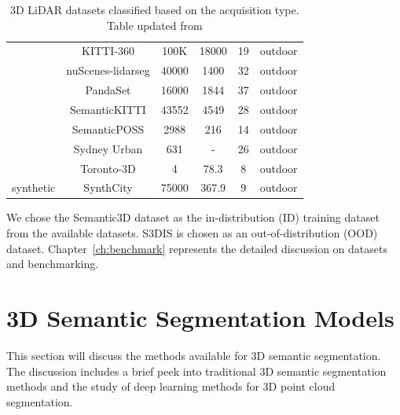 \begin{table}[h!]
\begin{tabular}{c|c|c|c|c|c}
                                        & KITTI-360\cite{Xie_2016_CVPR_KITTI_360} & 100K & 18000 & 19 & outdoor\\ %
                                        & nuScenes-lidarseg\cite{caesar2020nuscenes} & 40000 & 1400 & 32& outdoor\\ %
                                        & PandaSet\cite{PandaSet} & 16000 & 1844 & 37 & outdoor \\ %
                                        & SemanticKITTI\cite{Behley_2019_ICCV} & 43552 & 4549 & 28 & outdoor \\ %
                                        & SemanticPOSS\cite{pan2020semanticposs} & 2988 & 216 & 14 & outdoor \\ %
                                        & Sydney Urban\cite{de2013unsupervised} & 631 & - & 26 & outdoor\\ %
                                        & Toronto-3D\cite{tan2020toronto3d} & 4 & 78.3& 8& outdoor\\ %
    
            \hline
            \multirow{1}{*}{synthetic}  & SynthCity\cite{griffiths2019synthcity} & 75000 & 367.9 & 9 & outdoor \\ %
            \hline
        \end{tabular}
        \caption{3D LiDAR datasets classified based on the acquisition type. Table updated from \cite{survey3d}}
        \label{table:3d_lidar_datasets_table}
    \end{table}
    
    We chose the Semantic3D dataset as the in-distribution (ID) training dataset from the available datasets. 
    S3DIS is chosen as an out-of-distribution (OOD) dataset.
    Chapter~\ref{ch:benchmark} represents the detailed discussion on datasets and benchmarking.

    \section{3D Semantic Segmentation Models}

    This section will discuss the methods available for 3D semantic segmentation.
    The discussion includes a brief peek into traditional 3D semantic segmentation methods and the study of deep learning methods for 3D point cloud segmentation.

